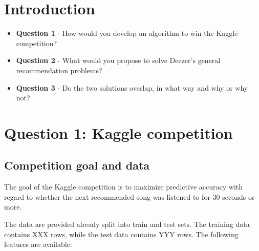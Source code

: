 \documentclass[
]{ceurart}
\begin{document}
\section{Introduction}



\begin{itemize}
    \item \textbf{Question 1} - How would you develop an algorithm to win the Kaggle competition?
    \item \textbf{Question 2} - What would you propose to solve Deezer's general recommendation problems?
    \item \textbf{Question 3} - Do the two solutions overlap, in what way and why or why not?
\end{itemize}

\section{Question 1: Kaggle competition}

\subsection{Competition goal and data}

The goal of the Kaggle competition is to maximize predictive accuracy with regard to whether the next recommended song was listened to for 30 seconds or more.

The data are provided already split into train and test sets. The training data contains XXX rows, while the test data contains YYY rows. The following features are available:
\end{document}
